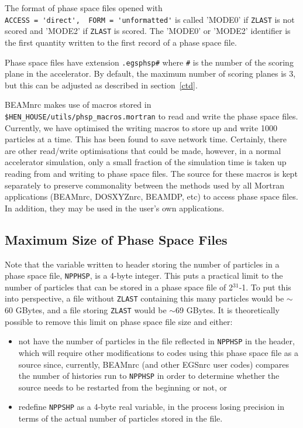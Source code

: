 \documentclass[12pt,twoside]{article}
\begin{document}
The format of phase space files opened with \\
\verb+ACCESS = 'direct',  FORM = 'unformatted'+ is called
'MODE0' if
\verb+ZLAST+ is not
scored and 'MODE2' if
\verb+ZLAST+ is scored.  The 'MODE0' or 'MODE2'
identifier is the first quantity written to the first record of a phase space file.

Phase space files have extension \verb+.egsphsp#+ where \verb+#+
is the number of the scoring plane in the accelerator.  By default, the
maximum number of scoring planes is 3, but this can be adjusted as
described in section~\ref{ctd}.

BEAMnrc makes use of macros stored in
{\tt \$HEN\_HOUSE/utils/phsp\_macros.mortran} to read and
write the phase space files.  Currently, we have optimised the
writing macros to store up and write 1000 particles at a time.  This has
been found to save network time.  Certainly, there are other read/write
optimisations that could be made, however, in a normal accelerator simulation,
only a small fraction of the simulation time is taken up reading from and
writing to phase space files.
The source for these macros is kept separately to preserve commonality between
the methods used by all Mortran applications (BEAMnrc, DOSXYZnrc, BEAMDP, etc)
to access phase space files.  In addition, they may be used in the user's own
applications. 

\subsection{Maximum Size of Phase Space Files}
Note that the variable written to header storing the number of particles
in a phase space file, {\tt NPPHSP}, is a 4-byte integer.  This puts a
practical limit to the number of particles that can be stored in
a phase space file of 2$^{31}$-1.  To put this into perspective, a file
without {\tt ZLAST} containing this many particles would be $\sim$60 GBytes,
and a file storing {\tt ZLAST} would be $\sim$69 GBytes.  It is theoretically
possible to remove this limit on phase space file size and either:
\begin{itemize}
\item not have the number of particles in the file reflected in {\tt NPPHSP} in
the header, which will require other modifications to codes using this phase space
file as a source since, currently, BEAMnrc (and other EGSnrc user codes) compares
the number of histories run to {\tt NPPHSP} in order to determine whether the
source needs to be restarted from the beginning or not, or
\item redefine {\tt NPPSHP} as a 4-byte real variable, in the process losing
precision in terms of the actual number of particles stored in the file.
\end{itemize}
\end{document}
